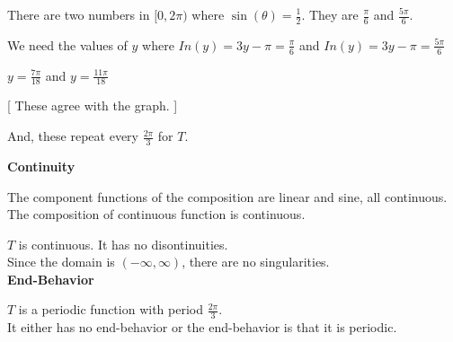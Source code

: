 \documentclass{ximera}
\begin{document}
There are two numbers in $[0, 2\pi)$ where $\sin(\theta) = \frac{1}{2}$.  They are $\frac{\pi}{6}$ and $\frac {5\pi}{6}$.

We need the values of $y$ where $In(y) = 3y - \pi = \frac{\pi}{6}$ and $In(y) = 3y - \pi = \frac{5\pi}{6}$

$y = \frac{7\pi}{18}$  and   $y = \frac{11\pi}{18}$

[ These agree with the graph. ]


And, these repeat every $\frac{2\pi}{3}$ for $T$.












\textbf{\textcolor{blue!55!black}{Continuity}}


The component functions of the composition are linear and sine, all continuous. \\

The composition of continuous function is continuous.

$T$ is continuous. It has no disontinuities. \\


Since the domain is $(-\infty, \infty)$, there are no singularities. \\








\textbf{\textcolor{blue!55!black}{End-Behavior}}


$T$ is a periodic function with period $\frac{2\pi}{3}$. \\

It either has no end-behavior or the end-behavior is that it is periodic.
\end{document}
